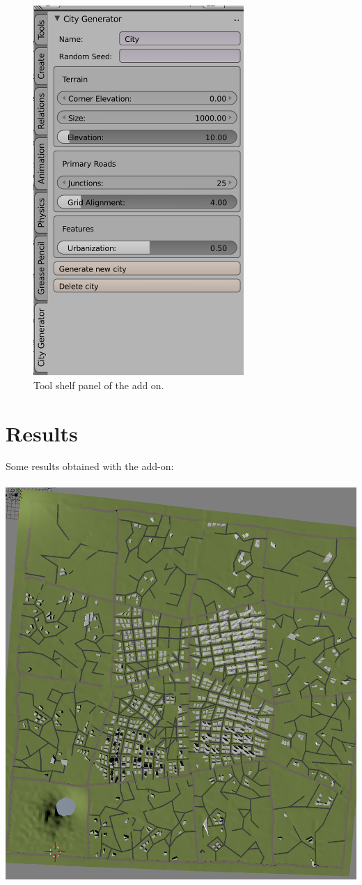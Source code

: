 \documentclass[a4paper,12pt]{scrartcl}
\begin{document}
\begin{figure}[h]
\center
\includegraphics[width=8cm]{param.png}
\caption{Tool shelf panel of the add on.}
\label{fig:param}
\end{figure}

\section{Results}
Some results obtained with the add-on: \\ \\
\center
\includegraphics[width=\textwidth]{view3.png}
\end{document}
